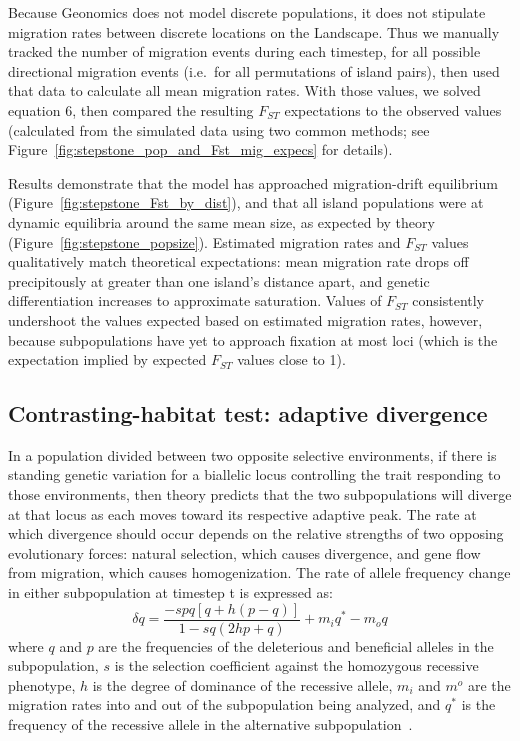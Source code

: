 ﻿\documentclass{article}
\begin{document}
Because Geonomics does not model discrete populations, it does not stipulate
migration rates between discrete locations on the Landscape.
Thus we manually tracked the number of migration events during each timestep,
for all possible directional migration events (i.e.\ for all permutations of island pairs),
then used that data to calculate all mean migration rates.
With those values, we solved equation 6, then compared
the resulting $F_{ST}$ expectations to the observed values
(calculated from the simulated data using two common methods; see Figure~\ref{fig:stepstone_pop_and_Fst_mig_expecs} for details).

Results demonstrate that the model has approached migration-drift equilibrium
(Figure~\ref{fig:stepstone_Fst_by_dist}), and that all island populations were at dynamic equilibria around the
same mean size, as expected by theory (Figure~\ref{fig:stepstone_popsize}). 
Estimated migration rates and $F_{ST}$ values qualitatively match theoretical expectations:
mean migration rate drops off precipitously at greater than one island's distance apart, 
and genetic differentiation increases to approximate saturation.
Values of $F_{ST}$ consistently undershoot the values expected based on estimated
migration rates, however, because subpopulations have yet to approach fixation
at most loci (which is the expectation implied by expected $F_{ST}$ values
close to 1).


\subsection{Contrasting-habitat test: adaptive divergence}
In a population divided between two opposite selective environments, if there is
standing genetic variation for a biallelic locus controlling the trait responding
to those environments, then theory predicts that the two subpopulations will diverge at
that locus as each moves toward its respective adaptive peak.
The rate at which divergence should occur depends on the relative strengths
of two opposing evolutionary forces: natural selection, which causes divergence,
and gene flow from migration, which causes homogenization. 
The rate of allele frequency change
in either subpopulation at timestep t is expressed as:
\begin{equation}
\delta{q} = \frac{-spq[q + h(p - q)]}{1 - sq(2hp + q)} + m_{i}q^{*} - m_{o}q
\end{equation}
where $q$ and $p$ are the frequencies of the deleterious and beneficial alleles
in the subpopulation, $s$ is the selection
coefficient against the homozygous recessive phenotype, $h$ is the degree of dominance
of the recessive allele, $m_{i}$ and $m^{o}$ are the migration rates into and out of
the subpopulation being analyzed, and $q^{*}$ is the frequency of the recessive allele
in the alternative subpopulation~\cite{hartl}.
\end{document}
